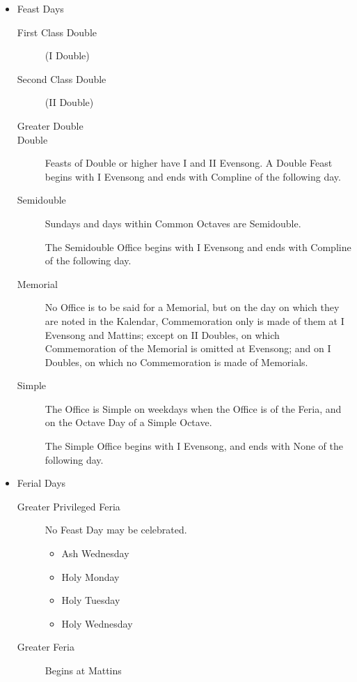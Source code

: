 \begin{itemize}
    \item Feast Days
        \begin{description}
            \item[First Class Double] (I Double)
            \item[Second Class Double] (II Double)
            \item[Greater Double]
            \item[Double] Feasts of Double or higher have I and II Evensong. A Double Feast begins with I Evensong and ends with Compline of the following day.
            \item[Semidouble] Sundays and days within Common Octaves are Semidouble.\par
            The Semidouble Office begins with I Evensong and ends with Compline of the following day.
            \item[Memorial] No Office is to be said for a Memorial, but on the day on which they are noted in the Kalendar, Commemoration only is made of them at I Evensong and Mattins; except on II Doubles, on which Commemoration of the Memorial is omitted at Evensong; and on I Doubles, on which no Commemoration is made of Memorials.
            \item[Simple] The Office is Simple on weekdays when the Office is of the Feria, and on the Octave Day of a Simple Octave.\par
                The Simple Office begins with I Evensong, and ends with None of the following day.
        \end{description}
    \item Ferial Days
        \begin{description}
            \item[Greater Privileged Feria] No Feast Day may be celebrated.
                \begin{itemize}
                    \item Ash Wednesday
                    \item Holy Monday
                    \item Holy Tuesday
                    \item Holy Wednesday
                \end{itemize}
            \item[Greater Feria] Begins at Mattins

\end{description}
\end{itemize}
